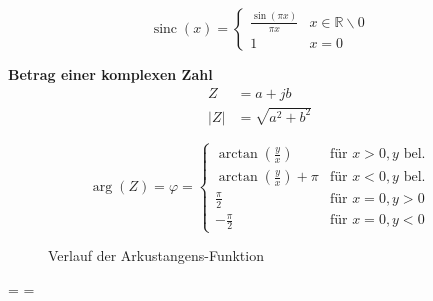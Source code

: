 \documentclass[12pt, a4paper, twoside]{scrartcl}
\begin{document}
\begin{minipage}{.5\linewidth}
  \[
    \operatorname{sinc}(x)=
    \begin{cases}
      \frac{\sin(\pi x)}{\pi x} & x \in\mathbb{R} \backslash 0\\
      1 & x = 0
    \end{cases}
  \]
\end{minipage}%
\begin{minipage}{.5\linewidth}
  \begin{center}
  \end{center}
\end{minipage}

\textbf{Betrag einer komplexen Zahl}
\begin{align*}
  Z &= a + jb\\
  |Z| &= \sqrt{a^2 +b^2}
\end{align*}

\[\arg (Z) = \varphi =
  \begin{cases}
    \arctan \left(\frac{y}{x}\right) & \text{für } x>0, y \text{ bel.}\\
    \arctan \left(\frac{y}{x}\right) + \pi & \text{für } x<0, y \text{ bel.}\\
    \frac{\pi}{2} & \text{für } x = 0, y > 0\\
    - \frac{\pi}{2} & \text{für } x = 0,y < 0
  \end{cases}\]

\begin{figure}[H]
  \centering
  
  \caption{Verlauf der Arkustangens-Funktion}
\end{figure}

\begin{samepage}
  \nopagebreak
  \begin{mathframed}
    \cos \varphi =  \qquad
    \sin \varphi = 
  \end{mathframed}
\end{samepage}
\end{document}
